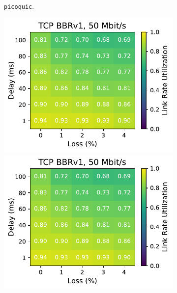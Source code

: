 \begin{figure}[ht]
\begin{subfigure}[b]{0.22\linewidth}
        \caption{\texttt{picoquic}.}
    \end{subfigure}
    \begin{subfigure}[b]{1cm}
        \includegraphics[width=\linewidth,trim={8cm 0 0 0},clip]{figures/heatmaps/heatmap_tcp_bbr1_50mbps.pdf}
        \vspace*{0.22cm}
        \includegraphics[width=\linewidth,trim={8cm 0 0 0},clip]{figures/heatmaps/heatmap_tcp_bbr1_50mbps.pdf}
        \vspace*{0.22cm}

\end{subfigure}
\end{figure}
